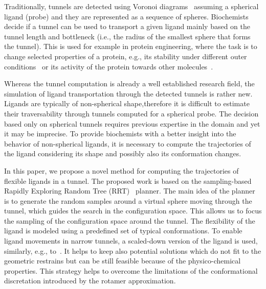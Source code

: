 \documentclass{svmult}
\begin{document}
Traditionally, tunnels are detected using Voronoi diagrams~\cite{yaffe2008,caver3} assuming
 a spherical ligand (probe) and they are represented as a sequence of spheres.
Biochemists decide if a tunnel can be used to transport a given ligand mainly based on the tunnel length and bottleneck (i.e., the radius of the smallest sphere that forms the tunnel).
This is used for example in protein engineering, where the task is to change selected properties of a protein, e.g., its stability under different outer conditions~\cite{Koudelakova2013} or its activity of the protein towards other molecules~\cite{Pavlova2009}.

Whereas the tunnel computation is already a well established research field, the simulation of ligand transportation through the detected tunnels is rather new.
Ligands are typically of non-spherical shape,therefore it is difficult to estimate their traversability through tunnels computed for a spherical probe.
The decision based only on spherical tunnels requires previous expertise in the domain and yet it may be imprecise.
To provide biochemists with a better insight into the behavior of non-spherical ligands, it is necessary to compute the trajectories of the ligand considering its shape and possibly also its conformation changes.

In this paper, we propose a novel method for computing the trajectories of flexible ligands in a tunnel.
The proposed work is based on the sampling-based Rapidly Exploring Random Tree (RRT)~\cite{lavalleRRT} planner.
The main idea of the planner is to generate the random samples around a virtual sphere moving through the tunnel, which
guides the search in the configuration space.
This allows us to focus the sampling of the configuration space around the tunnel.
The flexibility of the ligand is modeled using a predefined set of typical conformations.
To enable ligand movements in narrow tunnels, a scaled-down version of the ligand is used, similarly, e.g., to~\cite{cortes2005path}.
It helps to keep also potential solutions which do not fit to the geometric restrains but can be still feasible because of the physico-chemical properties.
This strategy helps to overcome the limitations of the conformational discretation introduced by the rotamer approximation.
\end{document}
